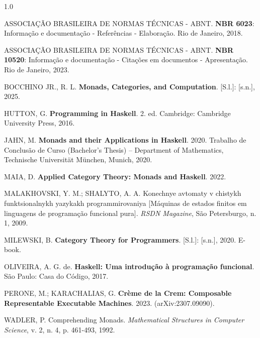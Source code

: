 \documentclass[12pt,a4paper]{article}
\begin{document}
\begingroup
\setlength{\parindent}{0pt}
\setlength{\parskip}{0.6em}
\begin{spacing}{1.0}

ASSOCIAÇÃO BRASILEIRA DE NORMAS TÉCNICAS - ABNT. \textbf{NBR 6023}: Informação e documentação - Referências - Elaboração. Rio de Janeiro, 2018.

ASSOCIAÇÃO BRASILEIRA DE NORMAS TÉCNICAS - ABNT. \textbf{NBR 10520}: Informação e documentação - Citações em documentos - Apresentação. Rio de Janeiro, 2023.

BOCCHINO JR., R. L. \textbf{Monads, Categories, and Computation}. [S.l.]: [s.n.], 2025.

HUTTON, G. \textbf{Programming in Haskell}. 2. ed. Cambridge: Cambridge University Press, 2016.

JAHN, M. \textbf{Monads and their Applications in Haskell}. 2020. Trabalho de Conclusão de Curso (Bachelor's Thesis) -- Department of Mathematics, Technische Universität München, Munich, 2020.

MAIA, D. \textbf{Applied Category Theory: Monads and Haskell}. 2022.

MALAKHOVSKI, Y. M.; SHALYTO, A. A. Konechnye avtomaty v chistykh funktsionalnykh yazykakh programmirovaniya [Máquinas de estados finitos em linguagens de programação funcional pura]. \textit{RSDN Magazine}, São Petersburgo, n. 1, 2009.

MILEWSKI, B. \textbf{Category Theory for Programmers}. [S.l.]: [s.n.], 2020. E-book.

OLIVEIRA, A. G. de. \textbf{Haskell: Uma introdução à programação funcional}. São Paulo: Casa do Código, 2017.

PERONE, M.; KARACHALIAS, G. \textbf{Crème de la Crem: Composable Representable Executable Machines}. 2023. (arXiv:2307.09090).

WADLER, P. Comprehending Monads. \textit{Mathematical Structures in Computer Science}, v. 2, n. 4, p. 461-493, 1992.

\end{spacing}
\endgroup
\end{document}
